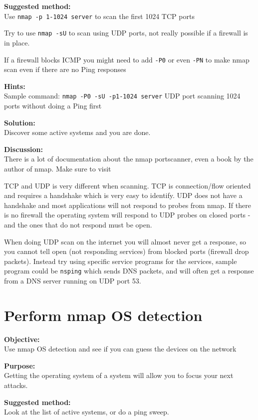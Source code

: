 \documentclass[a4paper,11pt,notitlepage]{report}
\begin{document}
{\bf Suggested method:}\\
Use \verb+nmap -p 1-1024 server+ to scan the first 1024 TCP
ports

Try to use \verb+nmap -sU+ to scan using UDP ports, not really possible if a firewall is in place.

If a firewall blocks ICMP you might need to add \verb+-P0+
or even \verb+-PN+ to make nmap scan even if there are no Ping responses

{\bf Hints:} \\
Sample command: \verb+nmap -P0 -sU -p1-1024 server+ UDP port scanning
1024 ports without doing a Ping first

{\bf Solution:}\\
Discover some active systems and you are done.

{\bf Discussion:}\\
There is a lot of documentation about the nmap portscanner, even a book by the author
of nmap. Make sure to visit 

TCP and UDP is very different when scanning. TCP is connection/flow oriented and requires a handshake which is very easy to identify. UDP does not have a handshake and most applications will not respond to probes from nmap. If there is no firewall the operating system will respond to UDP probes on closed ports - and the ones that do not respond must be open.

When doing UDP scan on the internet you will almost never get a response, so you cannot tell open (not responding services) from blocked ports (firewall drop packets). Instead try using specific service programs for the services, sample program could be \verb+nsping+ which sends DNS packets, and will often get a response from a DNS server running on UDP port 53.

\chapter{Perform nmap OS detection}
\label{ex:nmap-os}

{\bf Objective:} \\
Use nmap OS detection and see if you can guess the devices on the network

{\bf Purpose:}\\
Getting the operating system of a system will allow you to focus your next attacks.

{\bf Suggested method:}\\
Look at the list of active systems, or do a ping sweep.
\end{document}
